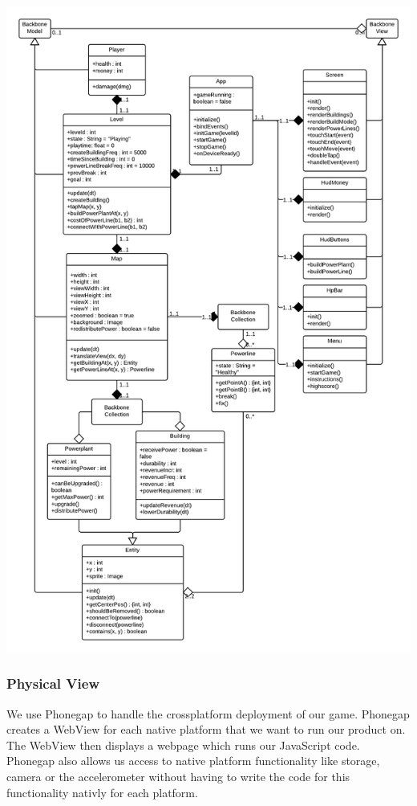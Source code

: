 \includegraphics[width=1.2\textwidth]{pictures/class_diagram}

\subsubsection*{Physical View}

We use Phonegap to handle the crossplatform deployment of our game. Phonegap creates a WebView for
each native platform that we want to run our product on. The WebView then displays a webpage which
runs our JavaScript code. Phonegap also allows us access to native platform functionality like
storage, camera or the accelerometer without having to write the code for this functionality nativly
for each platform.

